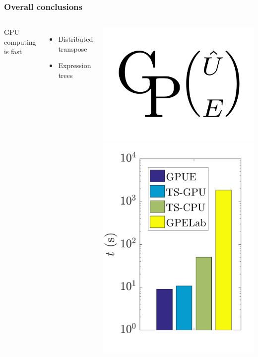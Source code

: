\documentclass{beamer}
\begin{document}
\begin{frame}
\frametitle{Overall conclusions}

\begin{columns}
GPU computing is fast
\begin{itemize}
\item Distributed transpose
\item Expression trees
\end{itemize}
\includegraphics[width=\textwidth]{GPUE.png}
\includegraphics[width=\textwidth]{bench.png}
\end{columns}


\end{frame}
\end{document}
